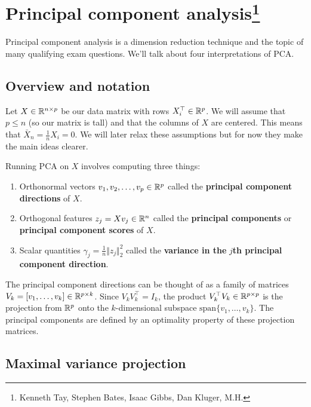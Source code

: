 \section{Principal component analysis\footnote{Kenneth Tay, Stephen Bates, Isaac Gibbs, Dan Kluger, M.H.}}

Principal component analysis is a dimension reduction technique and the topic of many qualifying exam questions. We'll talk about four interpretations of PCA.

\subsection{Overview and notation}


Let $X \in \mathbb{R}^{n \times p}$ be our data matrix with rows $X_i^\top \in \mathbb{R}^p$. We will assume that $p \le n$ (so our matrix is tall) and that the columns of $X$ are centered. This means that $\bar{X}_n = \frac{1}{n}X_i = 0$. We will later relax these assumptions but for now they make the main ideas clearer.

Running PCA on $X$ involves computing three things:
\begin{enumerate}
    \item Orthonormal vectors $v_1,v_2,\ldots,v_p \in \mathbb{R}^p$ called the \textbf{principal component directions} of $X$.
    \item Orthogonal features $z_j = Xv_j \in \mathbb{R}^n$ called the \textbf{principal components} or \textbf{principal component scores} of $X$.
    \item Scalar quantities $\gamma_j = \frac{1}{n}\Vert z_j \Vert^2_2$ called the \textbf{variance in the} $j$\textbf{th principal component direction}. 
\end{enumerate}
The principal component directions can be thought of as a family of matrices $V_k = [v_1,\ldots,v_k] \in \mathbb{R}^{p \times k}$. Since $V_k V_k^\top = I_k$, the product $V_k^\top V_k  \in \mathbb{R}^{p \times p}$ is the projection from $\mathbb{R}^p$ onto the $k$-dimensional subspace $\text{span}\{v_1,\ldots,v_k\}$. The principal components are defined by an optimality property of these projection matrices. 

\subsection{Maximal variance projection}

